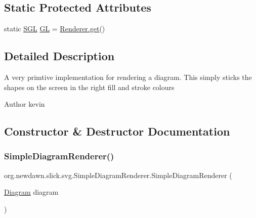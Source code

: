 \subsection*{Static Protected Attributes}
\begin{DoxyCompactItemize}
\item 
static \mbox{\hyperlink{interfaceorg_1_1newdawn_1_1slick_1_1opengl_1_1renderer_1_1_s_g_l}{S\+GL}} \mbox{\hyperlink{classorg_1_1newdawn_1_1slick_1_1svg_1_1_simple_diagram_renderer_adf6a659eed43175642b1d1ec2f94615b}{GL}} = \mbox{\hyperlink{classorg_1_1newdawn_1_1slick_1_1opengl_1_1renderer_1_1_renderer_abe742c3a7dfca67c6c01821d27087308}{Renderer.\+get}}()
\end{DoxyCompactItemize}


\subsection{Detailed Description}
A very primtive implementation for rendering a diagram. This simply sticks the shapes on the screen in the right fill and stroke colours

\begin{DoxyAuthor}{Author}
kevin 
\end{DoxyAuthor}


\subsection{Constructor \& Destructor Documentation}
\mbox{\label{classorg_1_1newdawn_1_1slick_1_1svg_1_1_simple_diagram_renderer_a37e21a052f321aa7c91c9c5420adc8c9}} 
\subsubsection{\texorpdfstring{Simple\+Diagram\+Renderer()}{SimpleDiagramRenderer()}}
{\footnotesize\ttfamily org.\+newdawn.\+slick.\+svg.\+Simple\+Diagram\+Renderer.\+Simple\+Diagram\+Renderer (\begin{DoxyParamCaption}\item[{\mbox{\hyperlink{classorg_1_1newdawn_1_1slick_1_1svg_1_1_diagram}{Diagram}}}]{diagram }\end{DoxyParamCaption})\hspace{0.3cm}{\ttfamily [inline]}}

